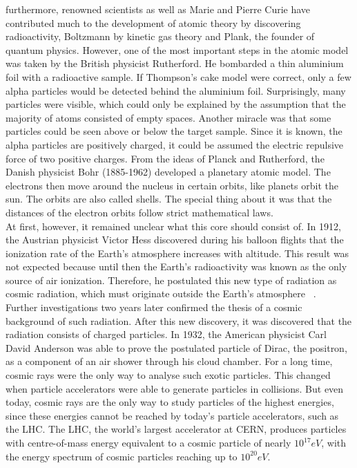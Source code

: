 furthermore, renowned scientists as well as Marie and Pierre Curie have contributed much to the development of atomic theory by discovering radioactivity, Boltzmann by kinetic gas theory and Plank, the founder of quantum physics.
However, one of the most important steps in the atomic model was taken by the British physicist Rutherford. He bombarded a thin aluminium foil with a radioactive sample. If Thompson's cake model were correct, only a few alpha particles would be detected behind the aluminium foil. Surprisingly, many particles were visible, which could only be explained by the assumption that the majority of atoms consisted of empty spaces. Another miracle was that some particles could be seen above or below the target sample. Since it is known, the alpha particles are positively charged, it could be assumed the electric repulsive force of two positive charges. From the ideas of Planck and Rutherford, the Danish physicist Bohr (1885-1962) developed a planetary atomic model. The electrons then move around the nucleus in certain orbits, like planets orbit the sun. The orbits are also called shells. The special thing about it was that the distances of the electron orbits follow strict mathematical laws.\\  
At first, however, it remained unclear what this core should consist of. \cite{haken2013atom, demtroder2005experimentalphysik}   
In 1912, the Austrian physicist Victor Hess discovered during his balloon flights that the ionization rate of the Earth's atmosphere increases with altitude. This result was not expected because until then the Earth's radioactivity was known as the only source of air ionization. Therefore, he postulated this new type of radiation as cosmic radiation, which must originate outside the Earth's atmosphere ~\cite{Ender}.\\
Further investigations two years later confirmed the thesis of a cosmic background of such radiation. After this new discovery, it was discovered that the radiation consists of charged particles. In 1932, the American physicist Carl David Anderson was able to prove the postulated particle of Dirac, the positron, as a component of an air shower through his cloud chamber. For a long time, cosmic rays were the only way to analyse such exotic particles.\cite{Bluemer:2009zf}
This changed when particle accelerators were able to generate particles in collisions. But even today, cosmic rays are the only way to study particles of the highest energies, since these energies cannot be reached by today's particle accelerators, such as the LHC. The LHC, the world's largest accelerator at CERN, produces particles with centre-of-mass energy equivalent to a cosmic particle of nearly $10^{17} eV $, with the energy spectrum of cosmic particles reaching up to $10^{20} eV $.
